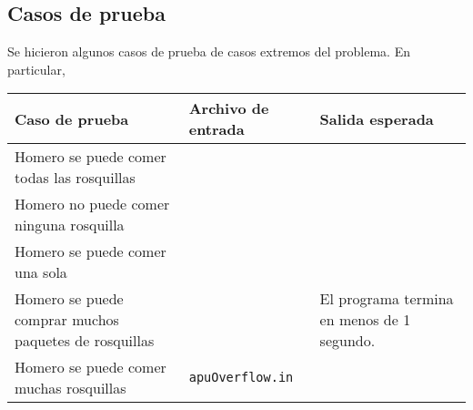 

\newpage{}

\subsection{Casos de prueba}

Se hicieron algunos casos de prueba de casos extremos del problema. En particular,

\begin{flushleft}
\begin{tabulary}{\textwidth}{@{}|L|L|L|@{}}
\hline
\textbf{Caso de prueba} & \textbf{Archivo de entrada} & \textbf{Salida esperada} \\
\hline
Homero se puede comer todas las rosquillas &  &  \\ \hline
Homero no puede comer ninguna rosquilla &  &  \\ \hline
Homero se puede comer una sola &  &  \\ \hline
Homero se puede comprar muchos paquetes de rosquillas &  & El programa termina en menos de 1 segundo. \\ \hline
Homero se puede comer muchas rosquillas & \texttt{apuOverflow.in} &  \\
\hline
\end{tabulary}
\end{flushleft}
